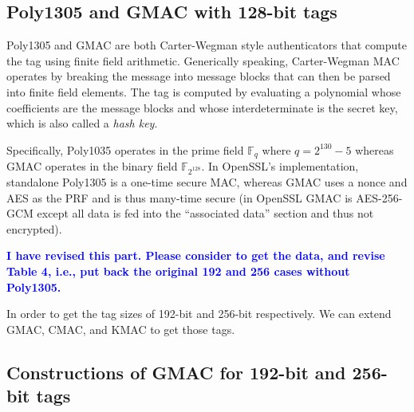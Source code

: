 \documentclass[journal=tches,submission]{iacrtrans}
\begin{document}

\subsection{Poly1305 and GMAC with 128-bit tags}
Poly1305 and GMAC are both Carter-Wegman style authenticators \cite{wegman1981new} that compute the tag using finite field arithmetic. Generically speaking, Carter-Wegman MAC operates by breaking the message into message blocks that can then be parsed into finite field elements. The tag is computed by evaluating a polynomial whose coefficients are the message blocks and whose interdeterminate is the secret key, which is also called a \textit{hash key}.

Specifically, Poly1035 operates in the prime field $\mathbb{F}_q$ where $q = 2^{130} - 5$ whereas GMAC operates in the binary field $\mathbb{F}_{2^{128}}$. In OpenSSL's implementation, standalone Poly1305 is a one-time secure MAC, whereas GMAC uses a nonce and AES as the PRF and is thus many-time secure (in OpenSSL GMAC is AES-256-GCM except all data is fed into the ``associated data'' section and thus not encrypted).


\textcolor{blue}{\textbf{ I have revised this part. Please consider to get the data, and revise Table 4, i.e., put back the original 192 and 256 cases without Poly1305. }
}


In order to get the tag sizes of 192-bit and 256-bit respectively. 
We can extend GMAC, CMAC, and KMAC to get those tags.

\subsection{Constructions of GMAC for 192-bit and 256-bit tags}
\end{document}
